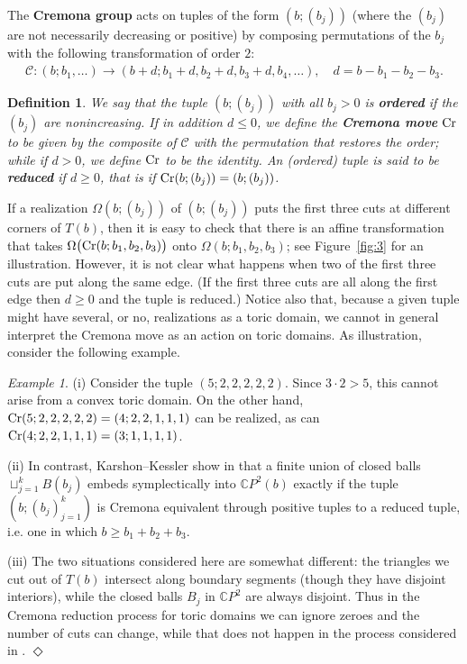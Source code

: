 \documentclass[11pt, reqno]{amsart}
\newtheorem{definition}[thm]{Definition}
\theoremstyle{remark}
\numberwithin{equation}{subsection}
\numberwithin{figure}{section}
\theoremstyle{customremark}
\newtheorem{example_no_diamond}[thm]{Example}
\newenvironment{example}{\begin{example_no_diamond} } {\hfill$\er$ \end{example_no_diamond}}
\newcommand{\NI}{{\noindent}}
\newcommand{\Cc}{{\mathcal C}}
\newcommand{\Om}{{\Omega}}
\newcommand{\MS}{{\medskip}}
\newcommand{\er}{{\Diamond}}
\newcommand{\C}{\mathbb{C}}
\begin{document}
The {\bf Cremona group} acts on tuples of the form $(b;(b_j))$ (where the $(b_j)$ are not necessarily decreasing or positive) by composing permutations of the $b_j$ with 
 the following  
 transformation of order $2$:
\begin{align}\label{eq:Cremon}
\Cc:  (b;b_1, \ldots) \to (b+d;b_1+d,b_2+d,b_3+d,b_4, \ldots), \quad d = b - b_1 - b_2 - b_3.
 \end{align}


\begin{definition} \label{def:Cremona}  We say that the tuple $(b; (b_j))$  with all $b_j>0$ is {\bf ordered} if the 
$(b_j)$ are nonincreasing. If in addition 
$d\le 0$, we define the {\bf Cremona move} ${\rm Cr}$ to be given by the composite of $\Cc$ with the permutation that restores the order; while if $d>0$, we define   
${\rm Cr}$  to be the identity.
An (ordered) tuple is said to be {\bf reduced} if $d\ge 0$, that is if 
${\rm Cr}(b; (b_j)) = (b; (b_j))$.
\end{definition}

If a realization
 $\Om(b; (b_j))$ of $(b; (b_j))$ puts the first three cuts at different corners of $T(b)$, then it is easy to check that there is an affine transformation that 
 takes $\Om\bigl({\rm Cr}(b; b_1,b_2,b_3)\bigr)$ onto  $\Om(b; b_1,b_2,b_3)$; see Figure~\ref{fig:3} for an illustration. However, it is not clear what happens when two of the first three cuts are put along the same edge. (If the first three cuts are all along the first edge then $d\ge 0$ and the tuple is reduced.)
Notice also that, because a given tuple might have several,  or no, realizations as a toric domain, we cannot   
 in general  interpret the Cremona move as an action on toric domains.  As illustration, consider the following example.

\begin{example} (i)
Consider the tuple $(5;2,2,2,2,2)$.  Since $3\cdot 2>5$, this cannot arise from a convex toric domain.  On the other hand, ${\rm Cr}(5;2,2,2,2,2) = (4;2,2,1,1,1)$ can be realized, as can ${\rm Cr}(4;2,2,1,1,1) = (3;1,1,1,1)$.   
\MS

\NI (ii) 
In contrast, Karshon--Kessler show in \cite{KK} that a finite union of closed balls $\sqcup_{j=1}^k B(b_j)$ embeds symplectically into $\C P^2(b)$ exactly if the tuple
$(b;(b_j)_{j=1}^k)$ is Cremona equivalent through positive tuples to a reduced tuple, i.e. one in which $b\ge b_1+b_2+b_3$. 
\MS

\NI
(iii) The two situations considered here are somewhat different: the triangles we cut out of $T(b)$  intersect along boundary segments (though they have disjoint interiors), while 
 the closed balls $B_j$ in $\C P^2$ are always disjoint. Thus in the Cremona reduction process for toric domains we can ignore zeroes and the number of cuts can change,
 while that does not happen in the process considered in \cite{KK}.
\end{example}
\end{document}
